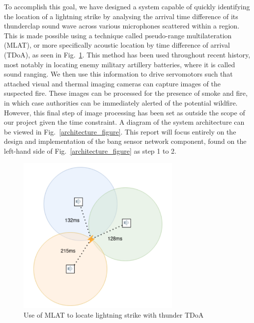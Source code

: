 \documentclass[conference]{IEEEtran}
\begin{document}
To accomplish this goal, we have designed a system capable of quickly identifying the location of a lightning strike by analysing the arrival time difference of its thunderclap sound wave across various microphones scattered within a region. This is made possible using a technique called pseudo-range multilateration (MLAT), or more specifically acoustic location by time difference of arrival (TDoA)\cite{mlat-tdoa}, as seen in Fig.~\ref{trilateration_figure}. This method has been used throughout recent history, most notably in locating enemy military artillery batteries, where it is called sound ranging\cite{sound-ranging}. We then use this information to drive servomotors such that attached visual and thermal imaging cameras can capture images of the suspected fire. These images can be processed for the presence of smoke and fire, in which case authorities can be immediately alerted of the potential wildfire. However, this final step of image processing has been set as outside the scope of our project given the time constraint. A diagram of the system architecture can be viewed in Fig.~\ref{architecture_figure}. This report will focus entirely on the design and implementation of the bang sensor network component, found on the left-hand side of Fig.~\ref{architecture_figure} as step 1 to 2.

\begin{figure}[ht]
\centerline{\includegraphics[width=80mm]{images/trilateration.png}}
\caption{Use of MLAT to locate lightning strike with thunder TDoA}
\label{trilateration_figure}
\end{figure}
\end{document}
